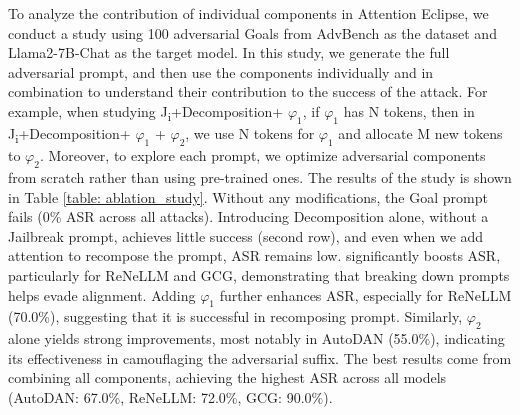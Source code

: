 To analyze the contribution of individual components in Attention Eclipse, we conduct a study using 100 adversarial Goals from AdvBench as the dataset and Llama2-7B-Chat as the target model. In this study, we generate the full adversarial prompt, and then use the components individually and in combination to understand their contribution to the success of the attack.  For example, when studying J\textsubscript{i}+Decomposition+ $\varphi_1$, if $\varphi_1$ has N tokens, then in J\textsubscript{i}+Decomposition+ $\varphi_1$ + $\varphi_2$, we use N tokens for $\varphi_1$ and allocate M new tokens to $\varphi_2$. Moreover, to explore each prompt, we optimize adversarial components from scratch rather than using pre-trained ones. The results of the study is shown in Table \ref{table: ablation_study}. Without any modifications, the Goal prompt fails (0\% ASR across all attacks). Introducing Decomposition alone, without a Jailbreak prompt, achieves little success (second row), and even when we add attention to recompose the prompt, ASR remains low.  significantly boosts ASR, particularly for ReNeLLM and GCG, demonstrating that breaking down prompts helps evade alignment. Adding $\varphi_1$ further enhances ASR, especially for ReNeLLM (70.0\%), suggesting that it is successful in recomposing prompt. Similarly, $\varphi_2$ alone yields strong improvements, most notably in AutoDAN (55.0\%), indicating its effectiveness in camouflaging the adversarial suffix. The best results come from combining all components, achieving the highest ASR across all models (AutoDAN: 67.0\%, ReNeLLM: 72.0\%, GCG: 90.0\%). %



